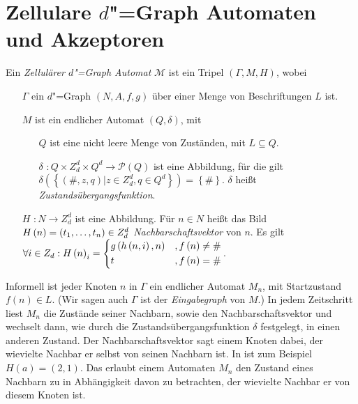 \documentclass[11pt]{article}
\newcommand{\defWord}[1]{\emph{#1}}
\begin{document}
\section{Zellulare $d$"=Graph Automaten und Akzeptoren}

\begin{definition}[$d$"=Graph Automat]
	Ein \defWord{Zellulärer $d$"=Graph Automat} $\mathcal{M}$ ist ein Tripel $\left(\Gamma, M, H\right)$, wobei
	\begin{itemize}
		\item[$\Gamma$] ein $d$"=Graph $\left(N, A, f, g\right)$ über einer Menge von Beschriftungen $L$ ist.
		\item[$M$]  ist ein endlicher Automat $\left(Q, \delta\right)$, mit 
		\begin{itemize}
			\item[$Q$] ist eine nicht leere Menge von Zuständen, mit $L \subseteq Q$.
			\item[$\delta$] $: Q \times Z_d^d \times Q^d \rightarrow \mathcal{P}\left(Q\right)$ ist eine Abbildung, für die gilt $\delta \left(\left \{\left(\#, z, q\right) \vert z \in Z_d^d, q \in Q^d\right \}\right) = \left \{\# \right \}$. $\delta$ heißt \defWord{Zustandsübergangsfunktion}.
		\end{itemize}
		\item[$H$] $: N \rightarrow Z_d^d$ ist eine Abbildung. 
		Für $n \in N$ heißt das Bild $H \left(n\right) = \left(t_1, \text{\dots}, t_n\right) \in Z_d^d$ \defWord{Nachbarschaftsvektor} von $n$. Es gilt $\forall i \in Z_d : H\left(n\right)_i = \begin{dcases}
		g\left(h\left(n, i\right), n\right) & ,f\left(n\right) \neq \# \\
		t & , f\left(n\right) = \# \\
		\end{dcases}$.
	\end{itemize}
\end{definition}

Informell ist jeder Knoten $n$ in $\Gamma$ ein endlicher Automat $M_n$, mit Startzustand $f\left(n\right) \in L$. 
(Wir sagen auch $\Gamma$ ist der \defWord{Eingabegraph} von $M$.) 
In jedem Zeitschritt liest $M_n$ die Zustände seiner Nachbarn, sowie den Nachbarschaftsvektor und wechselt dann, wie durch die Zustandsübergangsfunktion $\delta$ festgelegt, in einen anderen Zustand. 
Der Nachbarschaftsvektor sagt einem Knoten dabei, der wievielte Nachbar er selbst von seinen Nachbarn ist. 
In  ist zum Beispiel $H\left(a\right) = \left(2, 1\right)$. 
Das erlaubt einem Automaten $M_n$ den Zustand eines Nachbarn zu in Abhängigkeit davon zu betrachten, der wievielte Nachbar er von diesem Knoten ist.
\end{document}
